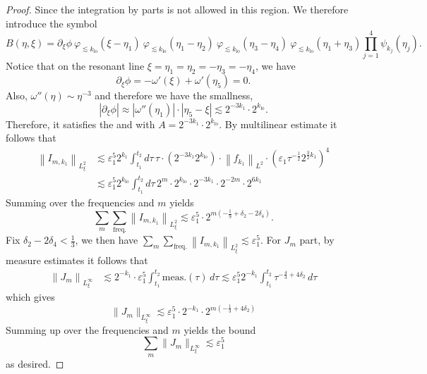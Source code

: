 \documentclass[reqno,english,11pt]{amsart}
\newcommand{\eps}{\varepsilon}
\newcommand{\snorm}[1]{\left\|#1\right\|}
\theoremstyle{definition}
\numberwithin{equation}{section}
\begin{document}
\begin{proof}
Since the integration by parts is not allowed in this region. We therefore
introduce the symbol
$$
 B(\eta,\xi) = \partial_{\xi}\phi \ \varphi_{\lesssim k_{\operatorname{lo}}}(\xi-\eta_1) \ \varphi_{\lesssim k_{\operatorname{lo}}}(\eta_1-\eta_2)\ \varphi_{\lesssim k_{\operatorname{lo}}}(\eta_3-\eta_4) \  \varphi_{\lesssim k_{\operatorname{lo}}}(\eta_1+\eta_3) \prod^4_{j=1} \psi_{k_{j}}(\eta_j).
$$
Notice that on the resonant line $\xi=\eta_1=\eta_2=-\eta_3=-\eta_4$, we have $$\partial_\xi \phi = -\omega'(\xi) + \omega'(\eta_5) = 0.$$ Also, $\omega''(\eta) \sim \eta^{-3}$ and therefore we have the smallness, $$|\partial_\xi \phi| \approx |\omega''(\eta_1)| \cdot |\eta_5 - \xi| \lesssim 2^{-3k_1} \cdot 2^{k_{\operatorname{lo}}}.$$ Therefore, it satisfies the \cite[Lemma B.3]{Morgan} and \cite[Lemma B.4]{Morgan} with $A= 2^{-3k_1} \cdot 2^{k_{\operatorname{lo}}}$. By multilinear estimate it follows that
$$\begin{aligned}
\snorm{I_{m, k_1}}_{L^2_\xi} &\lesssim \eps_1^5 2^{k_{1}}\int_{t_1}^{t_2} d\tau \, \tau \cdot \left( 2^{-3k_1} 2^{k_{\operatorname{lo}}} \right) \cdot \snorm{f_{k_1}}_{L^2} \cdot \left( \eps_1 \tau^{-\frac{1}{2}} 2^{\frac{3}{2}k_1} \right)^4\\
&\lesssim \eps_1^5 2^{k_{\operatorname{lo}}}\int_{t_1}^{t_2} d\tau \, 2^m \cdot 2^{k_{\operatorname{lo}}} \cdot 2^{-3k_1} \cdot 2^{-2m} \cdot 2^{6k_1} 
\end{aligned}$$
Summing over the frequencies and $m$ yields
$$
\sum_{m} \sum_{\text{freq.}} \snorm{I_{m,k_1}}_{L^2_{\xi}}\lesssim \eps_1^5\cdot 2^{m(-\frac{1}{9}+\delta_2-2\delta_4)}. 
$$
Fix $\delta_2-2\delta_4<\frac{1}{3}$, we then have $\sum_{m} \sum_{\text{freq.}} \snorm{I_{m,k_1}}_{L^2_{\xi}}\lesssim \eps_1^5$. For $J_m$ part, by measure estimates it follows that 
$$\begin{aligned}
\snorm{J_{m}}_{L^\infty_\xi} &\lesssim 2^{-k_1} \cdot \eps_1^5 \int_{t_1}^{t_2} \text{meas}.(\tau) \, d\tau \lesssim \eps_1^5 2^{-k_1} \int_{t_1}^{t_2} \tau^{-\frac{4}{3} + 4\delta_2} \, d\tau
\end{aligned}$$
which gives
$$\|J_{m}\|_{L^\infty_\xi} \lesssim \eps_1^5 \cdot 2^{-k_1} \cdot 2^{m(-\frac{1}{3} + 4\delta_2)}$$
Summing up over the frequencies and  $m$ yields the  bound
$$\sum_{m} \|J_{m}\|_{L^\infty_\xi} \lesssim \eps_1^5$$as desired.
\end{proof}
\end{document}
